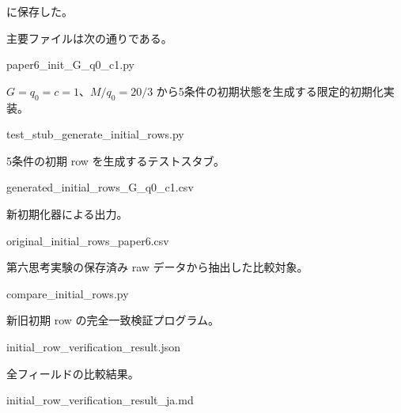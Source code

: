 \documentclass[
  a4paper,
]{ltjsarticle}
\newenvironment{Shaded}{}{}
\newcommand{\NormalTok}[1]{#1}
\begin{document}
に保存した。

主要ファイルは次の通りである。

\begin{Shaded}
\begin{Highlighting}[]
\NormalTok{paper6\_init\_G\_q0\_c1.py}
\end{Highlighting}
\end{Shaded}

\(G=q_0=c=1\)、\(M/q_0=20/3\)
から5条件の初期状態を生成する限定的初期化実装。

\begin{Shaded}
\begin{Highlighting}[]
\NormalTok{test\_stub\_generate\_initial\_rows.py}
\end{Highlighting}
\end{Shaded}

5条件の初期 row を生成するテストスタブ。

\begin{Shaded}
\begin{Highlighting}[]
\NormalTok{generated\_initial\_rows\_G\_q0\_c1.csv}
\end{Highlighting}
\end{Shaded}

新初期化器による出力。

\begin{Shaded}
\begin{Highlighting}[]
\NormalTok{original\_initial\_rows\_paper6.csv}
\end{Highlighting}
\end{Shaded}

第六思考実験の保存済み raw データから抽出した比較対象。

\begin{Shaded}
\begin{Highlighting}[]
\NormalTok{compare\_initial\_rows.py}
\end{Highlighting}
\end{Shaded}

新旧初期 row の完全一致検証プログラム。

\begin{Shaded}
\begin{Highlighting}[]
\NormalTok{initial\_row\_verification\_result.json}
\end{Highlighting}
\end{Shaded}

全フィールドの比較結果。

\begin{Shaded}
\begin{Highlighting}[]
\NormalTok{initial\_row\_verification\_result\_ja.md}
\end{Highlighting}
\end{Shaded}
\end{document}
